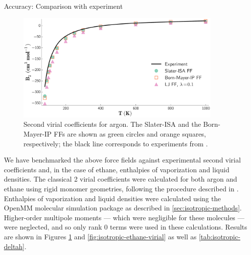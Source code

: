 \begin{subsection}{Accuracy: Comparison with experiment}
\label{sec:isotropic-accuracy_experiment}


    \begin{figure}
    \includegraphics[width=0.9\textwidth]{isotropic/ar_2nd_virial_wi_lj.pdf}
   \caption{
    Second virial coefficients for argon. The Slater-ISA and the Born-Mayer-IP
    FFs are shown as green
    circles and orange squares, respectively; the black line corresponds to
    experiments from .
           }
    \label{fig:isotropic-ar-virial}
    \end{figure}

We have benchmarked the above force fields against experimental 
second virial coefficients and, in the case of ethane, enthalpies of
vaporization and liquid densities.
The classical 2 virial coefficients were calculated for both argon and
ethane using rigid monomer geometries, following the procedure described in
. 
Enthalpies of
vaporization and liquid densities were calculated using the OpenMM molecular
simulation package
\cite{Eastman2013}
as described in \cref{sec:isotropic-methods}.
Higher-order multipole moments
--- which were negligible for these molecules --- were neglected, and so
only rank $0$ terms were used in these calculations. 
Results are shown in Figures \ref{fig:isotropic-ar-virial} and \ref{fig:isotropic-ethane-virial}
as well as \cref{tab:isotropic-deltah}.



\end{subsection}
